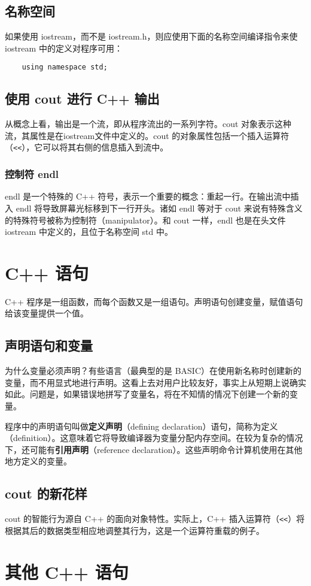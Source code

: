 \subsection{名称空间}
如果使用 iostream，而不是 iostream.h，则应使用下面的名称空间编译指令来使 iostream 中的定义对程序可用：
\begin{verbatim}
    using namespace std;
\end{verbatim}
\subsection{使用 cout 进行 C++ 输出}
从概念上看，输出是一个流，即从程序流出的一系列字符。cout 对象表示这种流，其属性是在iostream文件中定义的。cout 的对象属性包括一个插入运算符（\verb|<<|），它可以将其右侧的信息插入到流中。
\subsubsection{控制符 endl}
endl 是一个特殊的 C++ 符号，表示一个重要的概念：重起一行。在输出流中插入 endl 将导致屏幕光标移到下一行开头。诸如 endl 等对于 cout 来说有特殊含义的特殊符号被称为控制符（manipulator）。和 cout 一样，endl 也是在头文件 iostream 中定义的，且位于名称空间 std 中。
\section{C++ 语句}
C++ 程序是一组函数，而每个函数又是一组语句。声明语句创建变量，赋值语句给该变量提供一个值。
\subsection{声明语句和变量}
为什么变量必须声明？有些语言（最典型的是 BASIC）在使用新名称时创建新的变量，而不用显式地进行声明。这看上去对用户比较友好，事实上从短期上说确实如此。问题是，如果错误地拼写了变量名，将在不知情的情况下创建一个新的变量。

程序中的声明语句叫做\textbf{定义声明}（defining declaration）语句，简称为定义（definition）。这意味着它将导致编译器为变量分配内存空间。在较为复杂的情况下，还可能有\textbf{引用声明}（reference declaration）。这些声明命令计算机使用在其他地方定义的变量。
\subsection{cout 的新花样}
cout 的智能行为源自 C++ 的面向对象特性。实际上，C++ 插入运算符（\verb|<<|）将根据其后的数据类型相应地调整其行为，这是一个运算符重载的例子。
\section{其他 C++ 语句}
